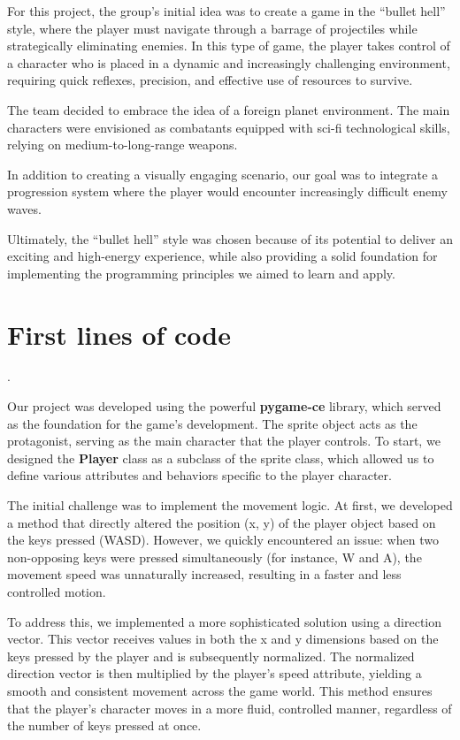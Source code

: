 \documentclass[a4paper,12pt]{article}
\begin{document}
For this project, the group’s initial idea was to create a game in the “bullet hell” style, where the player must navigate through a barrage of projectiles while strategically eliminating enemies. In this type of game, the player takes control of a character who is placed in a dynamic and increasingly challenging environment, requiring quick reflexes, precision, and effective use of resources to survive.

The team decided to embrace the idea of a foreign planet environment. The main characters were envisioned as combatants equipped with sci-fi technological skills, relying on medium-to-long-range weapons.

In addition to creating a visually engaging scenario, our goal was to integrate a progression system where the player would encounter increasingly difficult enemy waves.

Ultimately, the “bullet hell” style was chosen because of its potential to deliver an exciting and high-energy experience, while also providing a solid foundation for implementing the programming principles we aimed to learn and apply. 


\section*{First lines of code}
.

Our project was developed using the powerful \textbf{pygame-ce} library, which served as the foundation for the game's development. The sprite object acts as the protagonist, serving as the main character that the player controls. To start, we designed the \textbf{Player} class as a subclass of the sprite class, which allowed us to define various attributes and behaviors specific to the player character.

The initial challenge was to implement the movement logic. At first, we developed a method that directly altered the position (x, y) of the player object based on the keys pressed (WASD). However, we quickly encountered an issue: when two non-opposing keys were pressed simultaneously (for instance, W and A), the movement speed was unnaturally increased, resulting in a faster and less controlled motion.

To address this, we implemented a more sophisticated solution using a direction vector. This vector receives values in both the x and y dimensions based on the keys pressed by the player and is subsequently normalized. The normalized direction vector is then multiplied by the player's speed attribute, yielding a smooth and consistent movement across the game world. This method ensures that the player’s character moves in a more fluid, controlled manner, regardless of the number of keys pressed at once.
\end{document}
